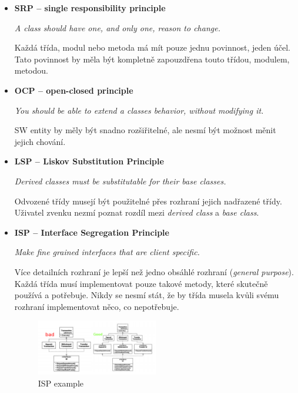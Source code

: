 \documentclass{szzclass}
\begin{document}
\begin{itemize}
      \item \textbf{SRP -- single responsibility principle}
      
      \textit{A class should have one, and only one, reason to change.}

      Každá třída, modul nebo metoda má mít pouze jednu povinnost, jeden účel.
      Tato povinnost by měla být kompletně zapouzdřena touto třídou, modulem, metodou.
      
      \item \textbf{OCP -- open-closed principle}
      
      \textit{You should be able to extend a classes behavior, without modifying it.}

      SW entity by měly být snadno rozšiřitelné, ale nesmí být možnost měnit jejich chování.
      
      \item \textbf{LSP -- Liskov Substitution Principle}
      
      \textit{Derived classes must be substitutable for their base classes.}

      Odvozené třídy musejí být použitelné přes rozhraní jejich nadřazené třídy.
      Uživatel zvenku nezmí poznat rozdíl mezi \textit{derived class} a \textit{base class}.
      
      \item \textbf{ISP -- Interface Segregation Principle}	
      
      \textit{Make fine grained interfaces that are client specific.}

      Více detailních rozhraní je lepší než jedno obsáhlé rozhraní (\textit{general purpose}).
      Každá třída musí implementovat pouze takové metody, které skutečně používá a potřebuje.
      Nikdy se nesmí stát, že by třída musela kvůli svému rozhraní implementovat něco, co nepotřebuje.
      \begin{figure}[ht]
            \centering
            \includegraphics[width=0.5\textwidth]{topics/bi-wsi-si-9/isp.png}
            \caption{ISP example}
      \end{figure}


\end{itemize}
\end{document}
